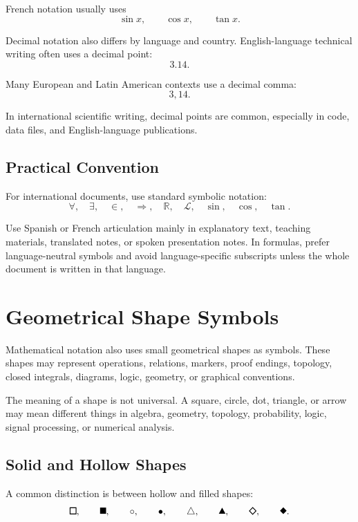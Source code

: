 \documentclass[11pt,twocolumn]{article}
\newcommand{\safesquare}{%
  \mathord{\vcenter{\hbox{\tikz[baseline=-0.5ex]\draw[line width=0.08em] (0,0) rectangle (0.62em,0.62em);}}}%
}
\newcommand{\safeblacksquare}{%
  \mathord{\vcenter{\hbox{\tikz[baseline=-0.5ex]\fill (0,0) rectangle (0.62em,0.62em);}}}%
}
\newcommand{\safeblacktriangle}{%
  \mathord{\vcenter{\hbox{\tikz[baseline=-0.5ex]\fill (0,0) -- (0.68em,0) -- (0.34em,0.62em) -- cycle;}}}%
}
\newcommand{\safediamond}{%
  \mathord{\vcenter{\hbox{\tikz[baseline=-0.5ex]\draw[line width=0.08em] (0.34em,0) -- (0.68em,0.34em) -- (0.34em,0.68em) -- (0,0.34em) -- cycle;}}}%
}
\newcommand{\safeblackdiamond}{%
  \mathord{\vcenter{\hbox{\tikz[baseline=-0.5ex]\fill (0.34em,0) -- (0.68em,0.34em) -- (0.34em,0.68em) -- (0,0.34em) -- cycle;}}}%
}
\begin{document}
French notation usually uses
\[
\sin x,
\qquad
\cos x,
\qquad
\tan x.
\]

Decimal notation also differs by language and country. English-language
technical writing often uses a decimal point:
\[
3.14.
\]

Many European and Latin American contexts use a decimal comma:
\[
3,14.
\]

In international scientific writing, decimal points are common, especially in
code, data files, and English-language publications.

\subsection{Practical Convention}

For international documents, use standard symbolic notation:
\[
\forall,
\quad
\exists,
\quad
\in,
\quad
\Rightarrow,
\quad
\mathbb{R},
\quad
\mathcal{L},
\quad
\sin,
\quad
\cos,
\quad
\tan.
\]

Use Spanish or French articulation mainly in explanatory text, teaching
materials, translated notes, or spoken presentation notes. In formulas, prefer
language-neutral symbols and avoid language-specific subscripts unless the whole
document is written in that language.

\section{Geometrical Shape Symbols}

Mathematical notation also uses small geometrical shapes as symbols. These
shapes may represent operations, relations, markers, proof endings, topology,
closed integrals, diagrams, logic, geometry, or graphical conventions.

The meaning of a shape is not universal. A square, circle, dot, triangle, or
arrow may mean different things in algebra, geometry, topology, probability,
logic, signal processing, or numerical analysis.

\subsection{Solid and Hollow Shapes}

A common distinction is between hollow and filled shapes:
\[
\safesquare,
\qquad
\safeblacksquare,
\qquad
\circ,
\qquad
\bullet,
\qquad
\triangle,
\qquad
\safeblacktriangle,
\qquad
\safediamond,
\qquad
\safeblackdiamond.
\]
\end{document}
